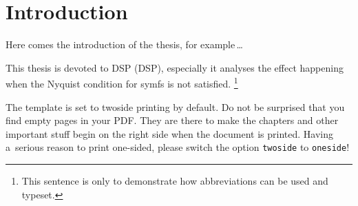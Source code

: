 \chapter*{Introduction}
{}

Here comes the introduction of the thesis, for example\,\dots

This thesis is devoted to \acs{DSP} (\acl{DSP}),
especially it analyses the effect happening when the Nyquist condition for \ac{symfs} is not satisfied.%
\footnote{This sentence is only to demonstrate how abbreviations can be used and typeset.}

The template is set to twoside printing by default.
Do not be surprised that you find empty pages in your PDF.
They are there to make the chapters and other important stuff begin on the right side when the document is printed.
Having a~serious reason to print one-sided, please switch the option \texttt{twoside} to \texttt{oneside}!